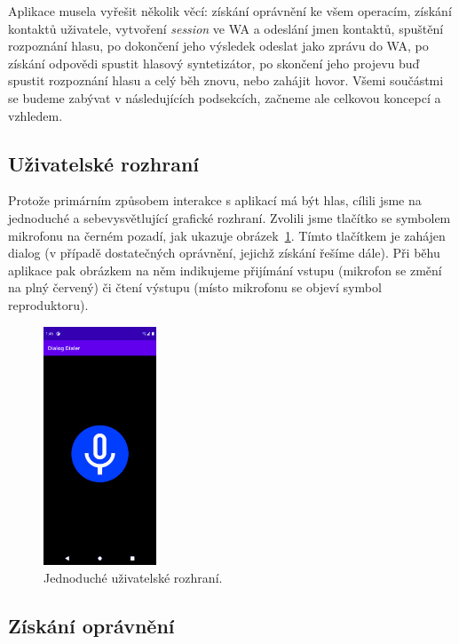 Aplikace musela vyřešit několik věcí: získání oprávnění ke všem operacím,
získání kontaktů uživatele, vytvoření \textit{session} ve WA a odeslání
jmen kontaktů, spuštění rozpoznání hlasu, po dokončení jeho výsledek odeslat
jako zprávu do WA, po získání odpovědi spustit hlasový syntetizátor, po skončení
jeho projevu buď spustit rozpoznání hlasu a celý běh znovu, nebo zahájit
hovor. Všemi součástmi se budeme zabývat v následujících podsekcích, začneme
ale celkovou koncepcí a vzhledem.

\subsection{Uživatelské rozhraní}

Protože primárním způsobem interakce
s aplikací má být hlas, cílili jsme na jednoduché a sebevysvětlující grafické
rozhraní. Zvolili jsme tlačítko se symbolem mikrofonu na černém pozadí,
jak ukazuje obrázek~\ref{img-ui}. Tímto tlačítkem je zahájen dialog (v případě
dostatečných oprávnění, jejichž získání řešíme dále). Při běhu aplikace
pak obrázkem na něm indikujeme přijímání vstupu (mikrofon se změní na
plný červený) či čtení výstupu (místo mikrofonu se objeví symbol reproduktoru).

\begin{figure}[h]
    \centering
    \includegraphics[width=0.3\textwidth]{../img/ui.pdf}
    \caption{Jednoduché uživatelské rozhraní.}
    \label{img-ui}
\end{figure}

\subsection{Získání oprávnění}

